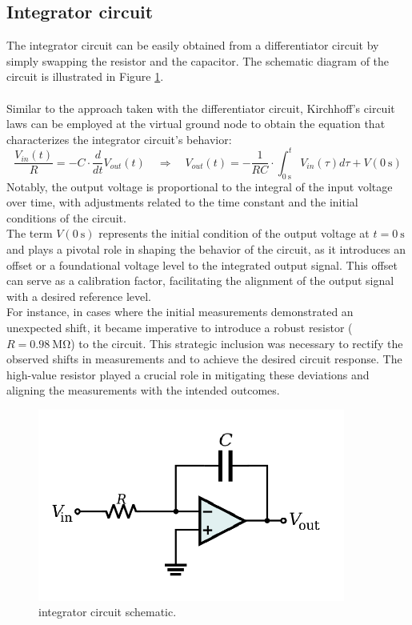 	\subsection{Integrator circuit}
		The integrator circuit can be easily obtained from a differentiator circuit by simply swapping the resistor and the capacitor. 
		The schematic diagram of the circuit is illustrated in Figure \ref{fig:integrator_circuit}. \\\\
		Similar to the approach taken with the differentiator circuit, Kirchhoff's circuit laws can be employed at the virtual ground node to obtain the equation that characterizes the integrator circuit's behavior: $$ \frac{V_{in}(t)}{R} = - C \cdot \frac{d}{dt}V_{out}(t) \quad \Longrightarrow \quad V_{out}(t) = - \frac{1}{RC} \cdot \int_{\SI{0}{\second}}^t V_{in}(\tau)d\tau + V(\SI{0}{\second}) $$
		Notably, the output voltage is proportional to the integral of the input voltage over time, with adjustments related to the time constant and the initial conditions of the circuit. \\
		The term $V(\SI{0}{\second})$ represents the initial condition of the output voltage at $t=\SI{0}{\second}$ and plays a pivotal role in shaping the behavior of the circuit, as it introduces an offset or a foundational voltage level to the integrated output signal. 
		This offset can serve as a calibration factor, facilitating the alignment of the output signal with a desired reference level. \\
		For instance, in cases where the initial measurements demonstrated an unexpected shift, it became imperative to introduce a robust resistor ($R=\SI{0.98}{\mega\ohm}$) to the circuit. 
		This strategic inclusion was necessary to rectify the observed shifts in measurements and to achieve the desired circuit response. 
		The high-value resistor played a crucial role in mitigating these deviations and aligning the measurements with the intended outcomes.
		\begin{figure}[H]
		    \centering
		    \includegraphics[width=0.9\textwidth]{figures/integrator/circuit.png}
		    \caption{integrator circuit schematic.}
		    \label{fig:integrator_circuit}
		\end{figure}
